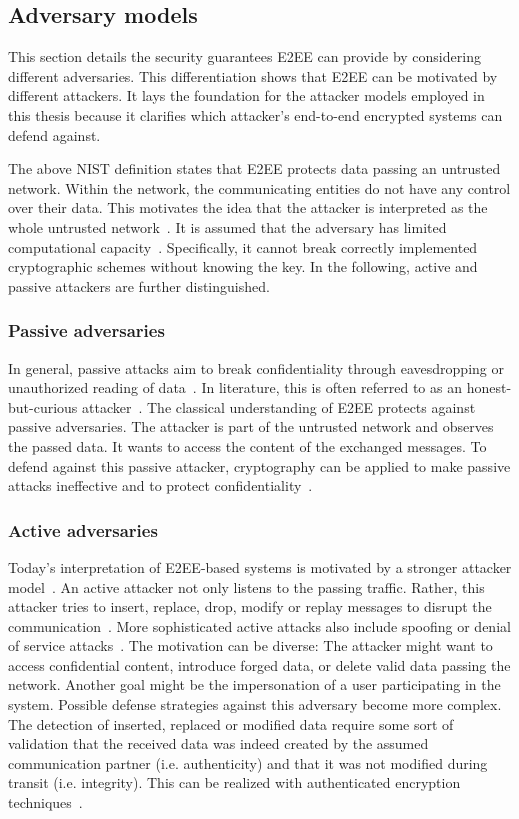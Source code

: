 \documentclass[../main.tex]{subfiles}
\begin{document}
\subsection{Adversary models}
This section details the security guarantees E2EE can provide by considering different adversaries.
This differentiation shows that E2EE can be motivated by different attackers.
It lays the foundation for the attacker models employed in this thesis because it clarifies which attacker's end-to-end encrypted systems can defend against.

The above NIST definition states that E2EE protects data passing an untrusted network.
Within the network, the communicating entities do not have any control over their data.
This motivates the idea that the attacker is interpreted as the whole untrusted network~\cite{Nabeel2017}.
It is assumed that the adversary has limited computational capacity~\cite{Katz2020}. 
Specifically, it cannot break correctly implemented cryptographic schemes without knowing the key.
In the following, active and passive attackers are further distinguished. 

\subsubsection{Passive adversaries}
In general, passive attacks aim to break confidentiality through eavesdropping or unauthorized reading of data~\cite[18]{Eckert2018}. 
In literature, this is often referred to as an honest-but-curious attacker~\cite{Nabeel2017}.
The classical understanding of E2EE protects against passive adversaries. 
The attacker is part of the untrusted network and observes the passed data.
It wants to access the content of the exchanged messages.
To defend against this passive attacker, cryptography can be applied to make passive attacks ineffective and to protect confidentiality~\cite[18]{Eckert2018}.


\subsubsection{Active adversaries}
Today's interpretation of E2EE-based systems is motivated by a stronger attacker model~\cite{Hale2022}.
An active attacker not only listens to the passing traffic.
Rather, this attacker tries to insert, replace, drop, modify or replay messages to disrupt the communication~\cite{Nabeel2017}.
More sophisticated active attacks also include spoofing or denial of service attacks~\cite[19]{Eckert2018}.
The motivation can be diverse: 
The attacker might want to access confidential content, introduce forged data, or delete valid data passing the network.
Another goal might be the impersonation of a user participating in the system.
Possible defense strategies against this adversary become more complex.
The detection of inserted, replaced or modified data require some sort of validation that the received data was indeed created by the assumed communication partner (i.e. authenticity) and that it was not modified during transit (i.e. integrity).
This can be realized with authenticated encryption techniques~\cite{Mallory2022}.
\end{document}
